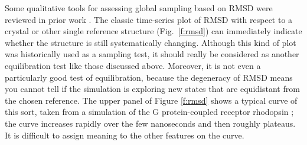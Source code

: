 

Some qualitative tools for assessing global sampling based on RMSD were reviewed
in prior work \cite{Grossfield2009}.   The classic time-series plot of RMSD with
respect to a crystal or other single reference structure (Fig.\ \ref{f:rmsd}) can immediately
indicate whether the structure is still systematically changing.  Although this
kind of plot was historically used as a sampling test, it should really be
considered as another equilibration test like those discussed above.  Moreover,
it is not even a particularly good test of equilibration, because the degeneracy
of RMSD means you cannot tell if the simulation is exploring new states that are
equidistant from the chosen reference.  The upper panel of Figure \ref{f:rmsd}
shows a typical curve of this sort, taken from a simulation of the G
protein-coupled receptor rhodopsin \cite{Grossfield-2015}; the curve increases
rapidly over the few nanoseconds and then roughly plateaus.  It is difficult to
assign meaning to the other features on the curve.

